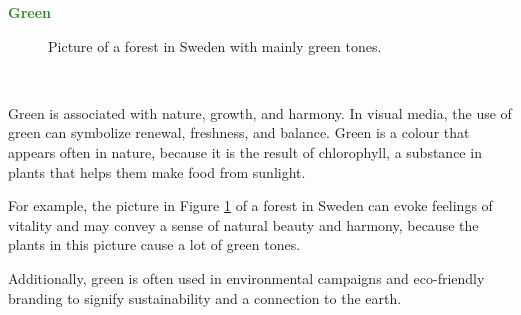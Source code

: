\documentclass[../MasterThesis.tex]{subfiles}
\begin{document}
\textbf{\textcolor{ForestGreen}{Green}}

%
%
\begin{minipage}{0.5\textwidth}
	\begin{figure}[H]
		\begin{center}
			\label{figure:green}
			\caption[Picture of a forest in Sweden with mainly green tones.]{Picture of a forest in Sweden with mainly green tones.}
		\end{center}
	\end{figure}\hfill
\end{minipage}\begin{minipage}{0.05\textwidth}
	\ 
\end{minipage}\begin{minipage}{0.45\textwidth}
	Green is associated with nature, growth, and harmony. In visual media, the use of green can symbolize renewal, freshness, and balance. Green is a colour that appears often in nature, because it is the result of chlorophyll, a substance in plants that helps them make food from sunlight.
	
	For example, the picture in Figure \ref{figure:green} of a forest in Sweden can evoke feelings of vitality  and  may convey a sense of natural beauty and harmony, because the plants in this picture cause a lot of green tones.
	
	Additionally, green is often used in environmental campaigns and eco-friendly branding to signify sustainability and a connection to the earth. 
	
	
	
	
	

\end{minipage}
\end{document}
